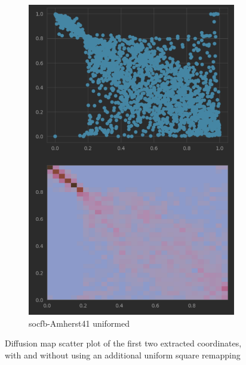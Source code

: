 \begin{figure}
\begin{subfigure}{0.49\textwidth}
      \includegraphics[width=\linewidth]{figures/real_diffmap_plot_uniformed.png}
      \caption{socfb-Amherst41 uniformed}
      \label{fig:sub4}
    \end{subfigure}
  
    \caption{Diffusion map scatter plot of the first two extracted coordinates, with and without using an additional uniform square remapping}
    \label{fig:diffmap_uniformed_vs_nonuniformed}
\end{figure}


